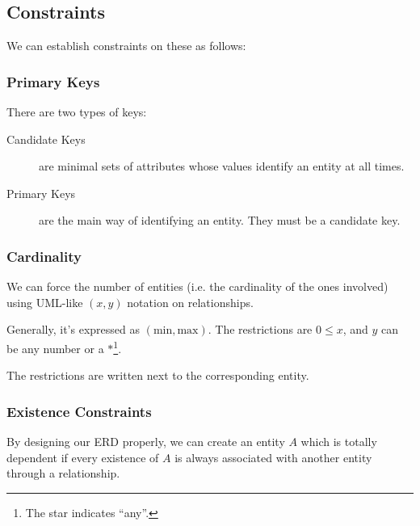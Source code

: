                 \subsection{Constraints} %
                \label{sub:constraints}
                    We can establish constraints on these as follows:
                    \subsubsection{Primary Keys} %
                    \label{ssub:primary_keys}
                        There are two types of keys:
                        \begin{description}
                            \item[Candidate Keys] are minimal sets of attributes whose values identify an entity at all times.
                            \item[Primary Keys] are the main way of identifying an entity.
                            They must be a candidate key.
                        \end{description}
                    \subsubsection{Cardinality} %
                    \label{ssub:cardinality}
                        We can force the number of entities (i.e. the cardinality of the ones involved) using UML-like $(x, y)$ notation on relationships.

                        Generally, it's expressed as $(\text{min}, \text{max})$.
                        The restrictions are $0\le x$, and $y$ can be any number or a $*$\footnote{The star indicates ``any''.}.

						The restrictions are written next to the corresponding entity.
                    \subsubsection{Existence Constraints} %
                    \label{ssub:existence_constraints}
                        By designing our ERD properly, we can create an entity $A$ which is totally dependent if every existence of $A$ is always associated with another entity through a relationship.
